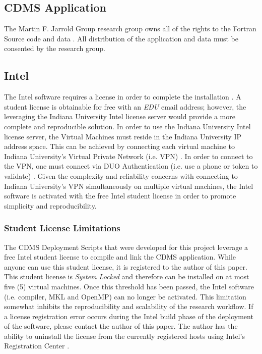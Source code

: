 \documentclass[9pt,twocolumn,twoside]{../../styles/osajnl}
\begin{document}
\subsection{CDMS Application} \label{cdms-license}
The Martin F. Jarrold Group research group owns all of the rights to
the Fortran Source code and data \cite{www-mfj}. All distribution of
the application and data must be consented by the research group.

\subsection{Intel} \label{intel-license}
The Intel software requires a license in order to complete the
installation \cite{www-intel-lic}. A student license is obtainable for
free with an \emph{EDU} email address; however, the leveraging the
Indiana University Intel license server would provide a more complete
and reproducible solution. In order to use the Indiana University
Intel license server, the Virtual Machines must reside in the Indiana
University IP address space. This can be achieved by connecting each
virtual machine to Indiana University's Virtual Private Network
(i.e. VPN) \cite{www-iu-vpn}. In order to connect to the VPN, one must
connect via DUO Authentication (i.e. use a phone or token to validate)
\cite{www-iu-duo}. Given the complexity and reliability concerns with
connecting to Indiana University's VPN simultaneously on multiple
virtual machines, the Intel software is activated with the free Intel
student license in order to promote simplicity and reproducibility.

\subsubsection{Student License Limitations} \label{student-license}
The CDMS Deployment Scripts that were developed for this project
leverage a free Intel student license to compile and link the CDMS
application. While anyone can use this student license, it is
registered to the author of this paper. This student license is
\emph{System Locked} and therefore can be installed on at most five
(5) virtual machines. Once this threshold has been passed, the Intel
software (i.e. compiler, MKL and OpenMP) can no longer be
activated. This limitation somewhat inhibits the reproducibility and
scalability of the research workflow. If a license registration error
occurs during the Intel build phase of the deployment of the software,
please contact the author of this paper. The author has the ability to
uninstall the license from the currently registered hosts using
Intel's Registration Center \cite{www-intel-reg}.
\end{document}
